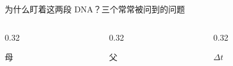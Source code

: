 \documentclass[aspectratio=169]{ctexbeamer}
\begin{document}
\begin{frame}{为什么盯着这两段 DNA？}{三个常常被问到的问题}
  \vspace{1mm}

  \begin{columns}[t]
    \begin{column}{0.32\textwidth}
      \begin{card}
        \centering
        {\color{pinkL}\Large 母}\\[1mm]
        \\[1mm]
      \end{card}
    \end{column}
    \begin{column}{0.32\textwidth}
      \begin{card}
        \centering
        {\color{blueL}\Large 父}\\[1mm]
        \\[1mm]
      \end{card}
    \end{column}
    \begin{column}{0.32\textwidth}
      \begin{card}
        \centering
        {\color{violetL}\Large $\Delta t$}\\[1mm]
        \\[1mm]
      \end{card}
    \end{column}
  \end{columns}

\end{frame}
\end{document}
